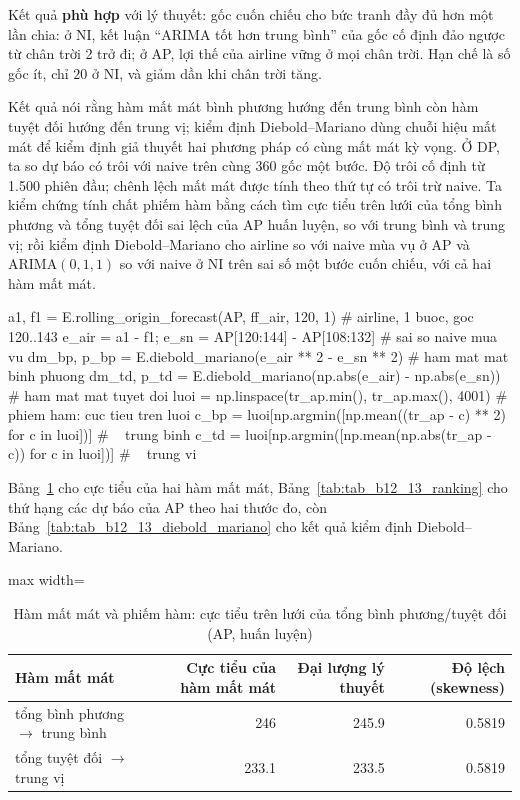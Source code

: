  Kết quả \textbf{phù hợp} với lý thuyết: gốc cuốn chiếu cho bức tranh đầy đủ hơn một lần chia: ở NI, kết luận ``ARIMA tốt hơn trung bình'' của gốc cố định đảo ngược từ chân trời 2 trở đi; ở AP, lợi thế của airline vững ở mọi chân trời. Hạn chế là số gốc ít, chỉ $20$ ở NI, và giảm dần khi chân trời tăng.

 Kết quả  nói rằng hàm mất mát bình phương hướng đến trung bình còn hàm tuyệt đối hướng đến trung vị; kiểm định Diebold--Mariano dùng chuỗi hiệu mất mát để kiểm định giả thuyết hai phương pháp có cùng mất mát kỳ vọng.
 Ở DP, ta so dự báo có trôi với naive trên cùng 360 gốc một bước. Độ trôi cố định từ 1.500 phiên đầu; chênh lệch mất mát được tính theo thứ tự có trôi trừ naive. Ta kiểm chứng tính chất phiếm hàm bằng cách tìm cực tiểu trên lưới của tổng bình phương và tổng tuyệt đối sai lệch của AP huấn luyện, so với trung bình và trung vị; rồi kiểm định Diebold--Mariano cho airline so với naive mùa vụ ở AP và ARIMA$(0,1,1)$ so với naive ở NI trên sai số một bước cuốn chiếu, với cả hai hàm mất mát.
\begin{codeblock}
a1, f1 = E.rolling_origin_forecast(AP, ff_air, 120, 1)          # airline, 1 buoc, goc 120..143
e_air = a1 - f1; e_sn = AP[120:144] - AP[108:132]               # sai so naive mua vu
dm_bp, p_bp = E.diebold_mariano(e_air ** 2 - e_sn ** 2)         # ham mat mat binh phuong
dm_td, p_td = E.diebold_mariano(np.abs(e_air) - np.abs(e_sn))   # ham mat mat tuyet doi
luoi = np.linspace(tr_ap.min(), tr_ap.max(), 4001)              # phiem ham: cuc tieu tren luoi
c_bp = luoi[np.argmin([np.mean((tr_ap - c) ** 2) for c in luoi])]      # ~ trung binh
c_td = luoi[np.argmin([np.mean(np.abs(tr_ap - c)) for c in luoi])]     # ~ trung vi
\end{codeblock}
 Bảng~\ref{tab:tab_b12_13_loss_functional} cho cực tiểu của hai hàm mất mát, Bảng~\ref{tab:tab_b12_13_ranking} cho thứ hạng các dự báo của AP theo hai thước đo, còn Bảng~\ref{tab:tab_b12_13_diebold_mariano} cho kết quả kiểm định Diebold--Mariano.
\begin{table}[H]
\centering\footnotesize
\caption{Hàm mất mát và phiếm hàm: cực tiểu trên lưới của tổng bình phương/tuyệt đối (AP, huấn luyện)}\label{tab:tab_b12_13_loss_functional}
\begin{adjustbox}{max width=\linewidth}
\begin{tabular}{|>{\raggedright\arraybackslash}p{}|r|r|r|}
\toprule
Hàm mất mát & Cực tiểu của hàm mất mát & Đại lượng lý thuyết & Độ lệch (skewness) \\
\midrule
tổng bình phương $\to$ trung bình & 246 & 245.9 & 0.5819 \\[3pt]
tổng tuyệt đối $\to$ trung vị & 233.1 & 233.5 & 0.5819 \\[3pt]
\bottomrule
\end{tabular}
\end{adjustbox}
\end{table}
